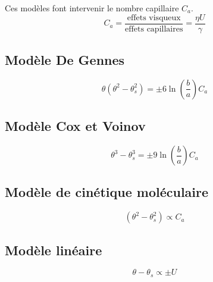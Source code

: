 Ces modèles font intervenir le nombre capillaire $C_{a}$.
\begin{equation}
	C_{a} 
	= \frac{\text{effets visqueux}}{\text{effets capillaires}} 
	= \frac{\eta U}{\gamma}
\end{equation}
\subsection*{Modèle De Gennes} 

\begin{equation}
	\label{modele:gennes}
	\theta 
	\left(\theta^{2} - \theta_{s}^{2}\right) 
	= \pm 6\ln\left(\frac{b}{a}\right)C_{a}
\end{equation}
\subsection*{Modèle Cox et Voinov}  

\begin{equation}
	\label{modele:Cox}
	\theta^{3} - \theta_{s}^{3} = 
	\pm 
	9\ln\left(
	\frac{b}{a}\right) C_{a}
\end{equation}
\subsection*{Modèle de cinétique moléculaire}  

\begin{equation}
	\left(\theta^{2} - \theta_{s}^{2}\right) 
	\propto C_{a}
\end{equation}
\subsection*{Modèle linéaire} 

\begin{equation}
	\theta - \theta_{s} \propto \pm U
\end{equation}

